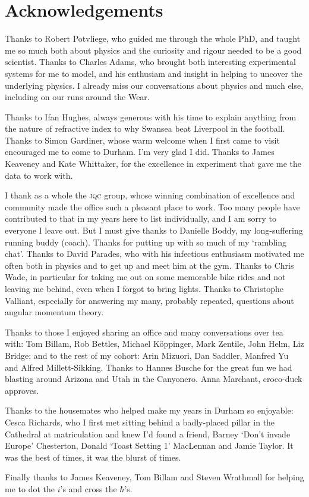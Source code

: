 \chapter*{Acknowledgements}

\begin{small} Thanks to Robert Potvliege, who guided me through the whole {PhD},
and taught me so much both about physics and the curiosity and rigour needed to
be a good scientist. Thanks to Charles Adams, who brought both interesting
experimental systems for me to model, and his enthusiam and insight in helping
to uncover the underlying physics. I already miss our conversations about
physics and much else, including on our runs around the Wear.

Thanks to Ifan Hughes, always generous with his time to explain anything from
the nature of refractive index to why Swansea beat Liverpool in the football.
Thanks to Simon Gardiner, whose warm welcome when I first came to visit
encouraged me to come to Durham. I'm very glad I did. Thanks to James Keaveney
and Kate Whittaker, for the excellence in experiment that gave me the data to
work with.

I thank as a whole the \textsc{jqc} group, whose winning combination of
excellence and community made the office such a pleasant place to work. Too many
people have contributed to that in my years here to list individually, and I am
sorry to everyone I leave out. But I must give thanks to Danielle Boddy,
my long-suffering running buddy (\ie coach). Thanks for putting up with so much
of my `rambling chat'. Thanks to David Parades, who with his infectious
enthusiasm motivated me often both in physics and to get up and meet him at
the gym. Thanks to Chris Wade, in particular for taking me out on some memorable
bike rides and not leaving me behind, even when I forgot to bring lights. Thanks
to Christophe Valliant, especially for answering my many, probably repeated,
questions about angular momentum theory.

Thanks to those I enjoyed sharing an office and many conversations over tea
with: Tom Billam, Rob Bettles, Michael K\"{o}ppinger, Mark Zentile, John Helm,
Liz Bridge; and to the rest of my cohort: Arin Mizuori, Dan Saddler, Manfred Yu
and Alfred Millett-Sikking. Thanks to Hannes Busche for the great fun we had
blasting around Arizona and Utah in the Canyonero. Anna Marchant, croco-duck
approves.

Thanks to the housemates who helped make my years in Durham so enjoyable: Cesca
Richards, who I first met sitting behind a badly-placed pillar in the Cathedral
at matriculation and knew I'd found a friend, Barney `Don't invade Europe'
Chesterton, Donald `Toast Setting 1' MacLennan and Jamie Taylor. It was the best
of times, it was the blurst of times.

Finally thanks to James Keaveney, Tom Billam and Steven Wrathmall for helping me
to dot the $i$'s and cross the $\hbar$'s.
\end{small}
